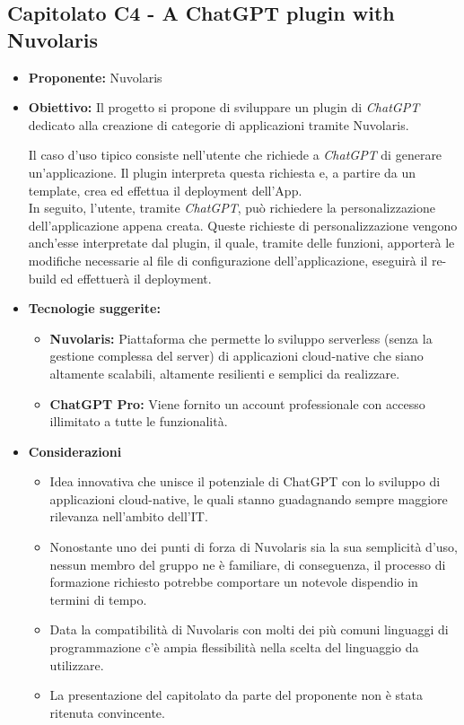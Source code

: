 \documentclass{article}
\begin{document}

\subsection{\textbf{Capitolato C4} - A ChatGPT plugin with Nuvolaris}
\begin{itemize}
    \item[] \textbf{Proponente:} Nuvolaris
    
    \item[] \textbf{Obiettivo:} Il progetto si propone di sviluppare un plugin di \textit{ChatGPT} dedicato alla creazione di categorie di applicazioni tramite Nuvolaris.
    
    Il caso d'uso tipico consiste nell'utente che richiede a \textit{ChatGPT} di generare un'applicazione. Il plugin interpreta questa richiesta e, a partire da un template, crea ed effettua il deployment dell'App. \\
    In seguito, l'utente, tramite \textit{ChatGPT}, può richiedere la personalizzazione dell'applicazione appena creata. Queste richieste di personalizzazione vengono anch'esse interpretate dal plugin, il quale, tramite delle funzioni, apporterà le modifiche necessarie al file di configurazione dell'applicazione, eseguirà il re-build ed effettuerà il deployment.
    
    \item[] \textbf{Tecnologie suggerite:}
    \begin{itemize}
        \item \textbf{Nuvolaris:} Piattaforma che permette lo sviluppo serverless (senza la gestione complessa del server) di applicazioni cloud-native che siano altamente scalabili, altamente resilienti e semplici da realizzare. 
        \item \textbf{ChatGPT Pro:} Viene fornito un account professionale con accesso illimitato a tutte le funzionalità.
    \end{itemize}
    
    \item[] \textbf{Considerazioni}
    \begin{itemize}
        \item Idea innovativa che unisce il potenziale di ChatGPT con lo sviluppo di applicazioni cloud-native, le quali stanno guadagnando sempre maggiore rilevanza nell'ambito dell'IT.
        \item Nonostante uno dei punti di forza di Nuvolaris sia la sua semplicità d'uso, nessun membro del gruppo ne è familiare, di conseguenza, il processo di formazione richiesto potrebbe comportare un notevole dispendio in termini di tempo.
        \item Data la compatibilità di Nuvolaris con molti dei più comuni linguaggi di programmazione c’è ampia flessibilità nella scelta del linguaggio da utilizzare.
        \item La presentazione del capitolato da parte del proponente non è stata ritenuta convincente.
    \end{itemize} 
    
\end{itemize}
\pagebreak
\end{document}
